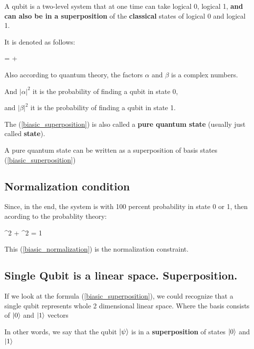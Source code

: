 \documentclass{article}
\begin{document}
A qubit is a two-level system that at one time can take logical 0, logical 1,\textbf{ and can also be in a superposition} of the \textbf{classical} states of logical 0 and logical 1.

It is denoted as follows:



\beq \label{biasic_superposition}
\ket{\psi} = \alpha{} + \beta{}
\eeq



Also according to quantum theory, the factors $\alpha$ and $\beta$ is a complex numbers.

And $|\alpha|^{2}$ it is the probability of finding a qubit in state 0,

and $|\beta|^{2}$ it is the probability of finding a qubit in state 1.

The (\ref{biasic_superposition}) is also called a \textbf{pure quantum state} (usually just called \textbf{state}).

A pure quantum state can be written as a superposition of basis states (\ref{biasic_superposition})

\subsection{Normalization condition}

Since, in the end, the system is with 100 percent probability in state 0 or 1, then acording to
the probablity theory:


\beq \label{biasic_normalization}
{\vert \alpha \vert}^2 + {\vert \beta \vert}^2 = 1
\eeq


This (\ref{biasic_normalization}) is the normalization constraint.




\subsection{Single Qubit is a linear space. Superposition.}


If we look at the formula (\ref{biasic_superposition}), we could recognize that a single qubit
represents whole 2 dimensional linear space. Where the basis consists of $\ket{0}$ and $\ket{1}$ vectors 

In other words, we say that the qubit $\ket{\psi}$ is in a \textbf{superposition} of states $\ket{0}$ and $\ket{1}$
\end{document}
